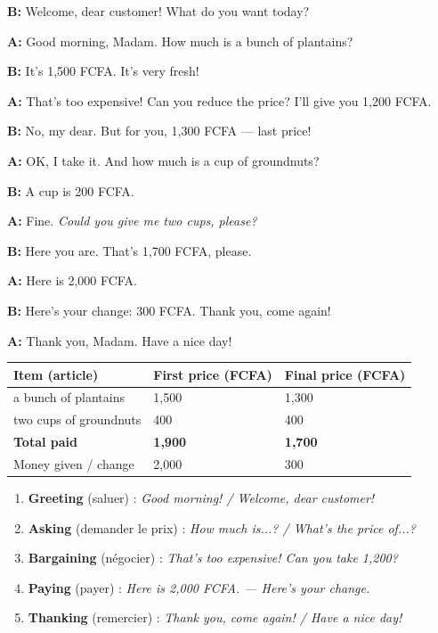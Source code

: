 \documentclass[11pt]{article}
\begin{document}
\begin{exemplebox}
\textbf{B:} Welcome, dear customer! What do you want today?\par
\textbf{A:} Good morning, Madam. How much is a bunch of plantains?\par
\textbf{B:} It's 1,500 FCFA. It's very fresh!\par
\textbf{A:} That's too expensive! Can you reduce the price? I'll give you 1,200 FCFA.\par
\textbf{B:} No, my dear. But for you, 1,300 FCFA — last price!\par
\textbf{A:} OK, I take it. And how much is a cup of groundnuts?\par
\textbf{B:} A cup is 200 FCFA.\par
\textbf{A:} Fine. \emph{Could you give me two cups, please?}\par
\textbf{B:} Here you are. That's 1,700 FCFA, please.\par
\textbf{A:} Here is 2,000 FCFA.\par
\textbf{B:} Here's your change: 300 FCFA. Thank you, come again!\par
\textbf{A:} Thank you, Madam. Have a nice day!
\end{exemplebox}

\begin{center}
\begin{tabularx}{\linewidth}{|l|X|X|}
\hline
\rowcolor{popblueL} \textbf{Item (article)} & \textbf{First price (FCFA)} & \textbf{Final price (FCFA)} \\
\hline
a bunch of plantains & 1,500 & 1,300 \\
\hline
two cups of groundnuts & 400 & 400 \\
\hline
\textbf{Total paid} & \textbf{1,900} & \textbf{1,700} \\
\hline
Money given / change & 2,000 & 300 \\
\hline
\end{tabularx}
\end{center}

\begin{methode}
\begin{enumerate}
\item \textbf{Greeting} (saluer) : \emph{Good morning! / Welcome, dear customer!}
\item \textbf{Asking} (demander le prix) : \emph{How much is...? / What's the price of...?}
\item \textbf{Bargaining} (négocier) : \emph{That's too expensive! Can you take 1,200?}
\item \textbf{Paying} (payer) : \emph{Here is 2,000 FCFA. — Here's your change.}
\item \textbf{Thanking} (remercier) : \emph{Thank you, come again! / Have a nice day!}
\end{enumerate}
\end{methode}
\end{document}
